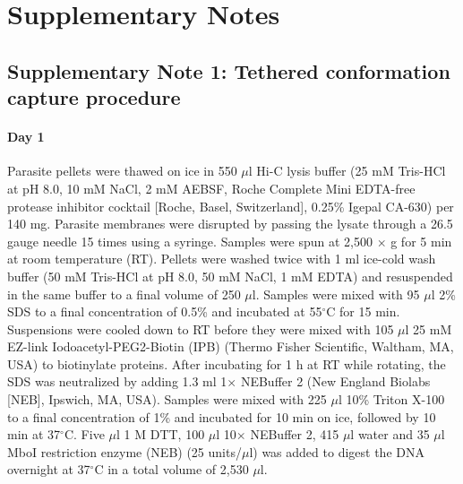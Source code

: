 \documentclass{article}
\begin{document}



\section*{Supplementary Notes}

\subsection*{Supplementary Note 1: Tethered conformation capture procedure}
\label{supp:ourHiC}
\paragraph{Day 1}
 Parasite pellets were thawed on
ice in 550 $\mu$l Hi-C lysis buffer (25 mM Tris-HCl at pH 8.0, 10 mM NaCl,
2 mM AEBSF, Roche Complete Mini EDTA-free protease inhibitor cocktail
[Roche, Basel, Switzerland], 0.25\% Igepal CA-630) per 140
mg. Parasite membranes were disrupted by passing the lysate through a
26.5 gauge needle 15 times using a syringe. Samples were spun at 2,500
$\times$ g for 5 min at room temperature (RT). Pellets were washed twice with
1 ml ice-cold wash buffer (50 mM Tris-HCl at pH 8.0, 50 mM NaCl, 1 mM
EDTA) and resuspended in the same buffer to a final volume of 250
$\mu$l. Samples were mixed with 95 $\mu$l 2\% SDS to a final concentration of
0.5\% and incubated at 55$^\circ$C for 15 min. Suspensions were cooled down
to RT before they were mixed with 105 $\mu$l 25 mM EZ-link
Iodoacetyl-PEG2-Biotin (IPB) (Thermo Fisher Scientific, Waltham, MA,
USA) to biotinylate proteins. After incubating for 1 h at RT while
rotating, the SDS was neutralized by adding 1.3 ml 1$\times$ NEBuffer 2 (New
England Biolabs [NEB], Ipswich, MA, USA). Samples were mixed with 225
$\mu$l 10\% Triton X-100 to a final concentration of 1\% and incubated for
10 min on ice, followed by 10 min at 37$^\circ$C. Five $\mu$l 1 M DTT, 100 $\mu$l 10$\times$
NEBuffer 2, 415 $\mu$l water and 35 $\mu$l MboI restriction enzyme (NEB) (25
units/$\mu$l) was added to digest the DNA overnight at 37$^\circ$C in a total
volume of 2,530 $\mu$l.
\end{document}
